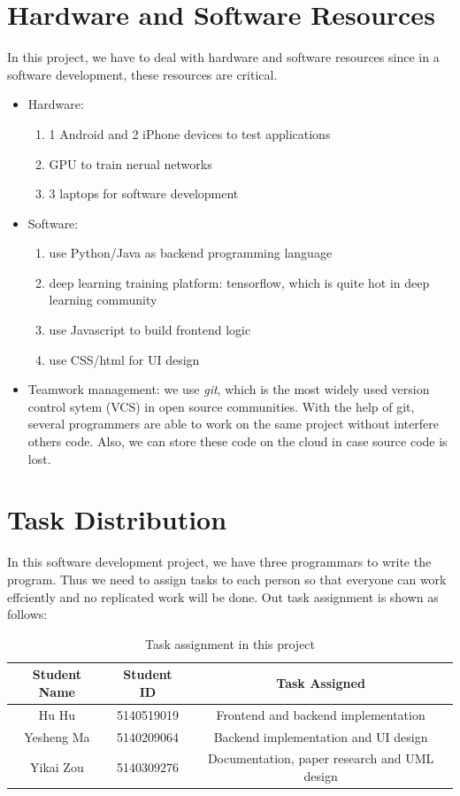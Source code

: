 \documentclass[12pt]{article}
\begin{document}
\section{Hardware and Software Resources}
In this project, we have to deal with hardware and software resources since 
in a software development, these resources are critical.



\begin{itemize}
\item Hardware:
\begin{enumerate}
\item 1 Android and 2 iPhone devices to test applications
\item GPU to train nerual networks
\item 3 laptops for software development
\end{enumerate}

\item Software:
\begin{enumerate}
\item use Python/Java as backend programming language
\item deep learning training platform: tensorflow, which is quite hot in deep learning community
\item use Javascript to build frontend logic
\item use CSS/html for UI design
\end{enumerate}

\item Teamwork management: we use \textsl{git}, which is the most widely used version control sytem (VCS) in open source communities. With the help of git, several programmers are able to work on the same project without interfere others code. Also, we can store these code on the cloud in case source code is lost.

\end{itemize}

\section{Task Distribution}
In this software development project, we have three programmars to write the program. Thus we need to assign tasks to each person so that everyone can work effciently and no replicated work will be done. Out task assignment is shown as follows:
\begin{table}[H]
	\centering
	\begin{tabular}{|c|c|c|}
		\hline
		Student Name & Student ID & Task Assigned \\
		\hline
		Hu Hu & 5140519019 & Frontend and  backend implementation  \\
		\hline
		Yesheng Ma & 5140209064 & Backend implementation and UI design\\
		\hline
		Yikai Zou & 5140309276 & Documentation, paper research and UML design\\
		\hline
	\end{tabular}
	\caption{Task assignment in this project}
\end{table}
\end{document}
